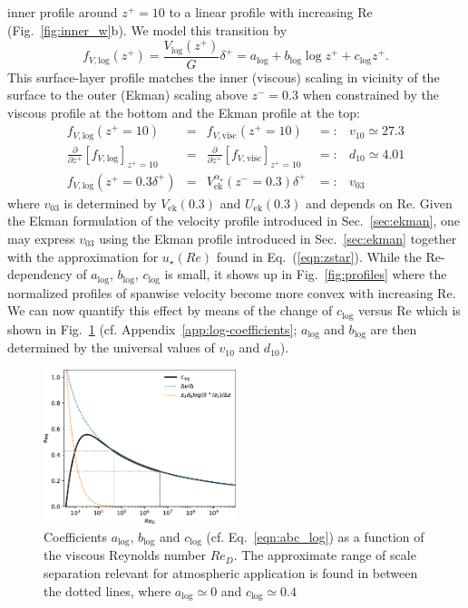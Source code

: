\documentclass[smallcondensed,final]{svjour3}
\newcommand{\p}{\partial}
\newcommand{\RE}{\mathrm{Re}}
\begin{document}
inner profile around $z^+=10$ to a linear profile with increasing $\RE$ (Fig.~\ref{fig:inner_w}b).
%
We model this transition by 
%
\begin{equation}
  f_{V,\mathrm{log}}(z^+) = \frac{V_\mathrm{log}(z^+)}{G} \delta^+ = a_\mathrm{log} + b_\mathrm{log} \log z^+ + c_\mathrm{log} z^+. 
  \label{eqn:abc_log}
\end{equation} 
%
This surface-layer profile matches the inner (viscous) scaling in vicinity of the surface to the outer
(Ekman) scaling above $z^-=0.3$ when constrained by the viscous profile at the bottom and the
Ekman profile at the top:
%
\begin{subequations} 
  \label{eqn:match}
\begin{align}
  f_{V,\mathrm{log}}(z^+=10) &=& f_{V,\mathrm{visc}}(z^+=10) &=:& v_{10} \simeq 27.3\\
  \frac{\p}{\p z^+} \left[ f_{V,\mathrm{log}}\right]_{z^+=10} &=& \frac{\p}{\p z^+}\left[ f_{V,\mathrm{visc}}\right]_{z^+=10} &=:&d_{10}\simeq 4.01 \\
  f_{V,\mathrm{log}}(z^+=0.3\delta^+) &=& V^{\alpha_\star}_\mathrm{ek}(z^-=0.3)\delta^+&=:& v_{03} 
\end{align}
\end{subequations}
where $v_{03}$ is determined by $V_\mathrm{ek}(0.3)$ and $U_\mathrm{ek}(0.3)$ and depends on $\RE$.
%
Given the Ekman formulation of the velocity profile introduced in Sec.~\ref{sec:ekman},
one may express $v_{03}$ using the Ekman profile introduced in Sec.~\ref{sec:ekman} together
with the approximation for $u_\star(Re)$ found in Eq.~(\ref{eqn:zstar}). 
% 
%
While the $\RE$-dependency of $a_\mathrm{log}$, $b_\mathrm{log}$, $c_\mathrm{log}$
is small, it shows up in Fig.~\ref{fig:profiles} where the normalized profiles
of spanwise velocity become more convex with increasing $\RE$.
%
We can now quantify this effect by means of the change of $c_\mathrm{log}$ versus $\RE$ which is shown in
Fig.~\ref{fig:clog} (cf. Appendix~\ref{app:log-coefficients};
$a_\mathrm{log}$ and $b_\mathrm{log}$ are then determined by the universal
values of $v_{10}$ and $d_{10}$).
%
%
\begin{figure}
  \centerline{\includegraphics[width=0.5\textwidth]{Fig9.eps}} %
  \caption{Coefficients $a_\text{log}$, $b_\text{log}$ and $c_\text{log}$ 
    (cf. Eq.~\ref{eqn:abc_log}) 
    as a function of 
    the viscous Reynolds number $Re_D$. The approximate range of scale separation relevant for atmospheric application 
    is found in between the dotted lines, where $a_\text{log}\simeq 0$ and $c_\text{log}\simeq 0.4$ }
  \label{fig:clog}
\end{figure} 
%
\par
% 
\end{document}
